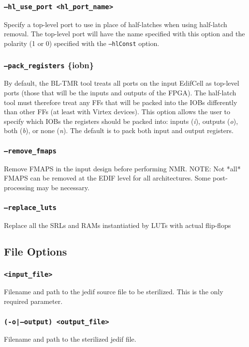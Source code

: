 \subsubsection{\texttt{--hl\_use\_port <hl\_port\_name>}}
Specify a top-level port to use in place of half-latches when 
using half-latch removal. The top-level port will have the name specified with 
this option and the polarity (1 or 0) specified with the \texttt{--hlConst} 
option.

\subsubsection{\texttt{--pack\_registers} \{i\textbar o\textbar b\textbar n\}}
By default, the BL-TMR tool treats all ports on the input EdifCell as top-level
ports (those that will be the inputs and outputs of the FPGA). The half-latch 
tool must therefore treat any FFs that will be packed into the IOBs differently
than other FFs (at least with Virtex devices). This option allows the user to
specify which IOBs the registers should be packed into: inputs (\emph{i}),
outputs (\emph{o}), both (\emph{b}), or none (\emph{n}). The default is to pack
both input and output registers.

\subsubsection{\texttt{--remove\_fmaps}}
Remove FMAPS in the input design before performing NMR.
NOTE: Not *all* FMAPS can be removed at the EDIF level for all
architectures. Some post-processing may be necessary.

\subsubsection{\texttt{--replace\_luts}}
Replace all the SRLs and RAMs instantiatied by LUTs with actual flip-flops

\subsection{File Options}

\subsubsection{\texttt{<input\_file>}}
Filename and path to the jedif source file to be
sterilized. This is the only required parameter.

\subsubsection{\texttt{(-o|--output) <output\_file>}}
Filename and path to the sterilized jedif file. 

